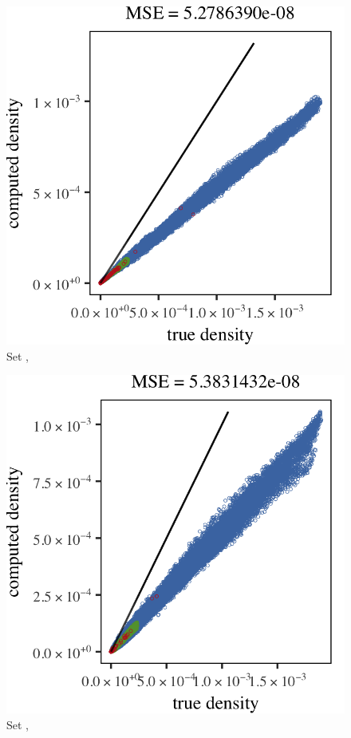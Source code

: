 
\begin{subfigure}{0.23\textwidth}
	\centering
	\includegraphics[keepaspectratio=true, width=\textwidth, height=0.23\textheight]{result/img/all/results_ferdosi_2_60000_mbe_silverman}
	\caption{Set \ferdosiTwo, \mbe}
	\label{fig:4:results:mbe:ferdosi2}
\end{subfigure}
\begin{subfigure}{0.23\textwidth}
	\centering
	\includegraphics[keepaspectratio=true, width=\textwidth, height=0.23\textheight]{result/img/all/results_baakman_2_60000_mbe_silverman}
	\caption{Set \baakmanTwo, \mbe}
	\label{fig:4:results:mbe:baakman2}
\end{subfigure}

